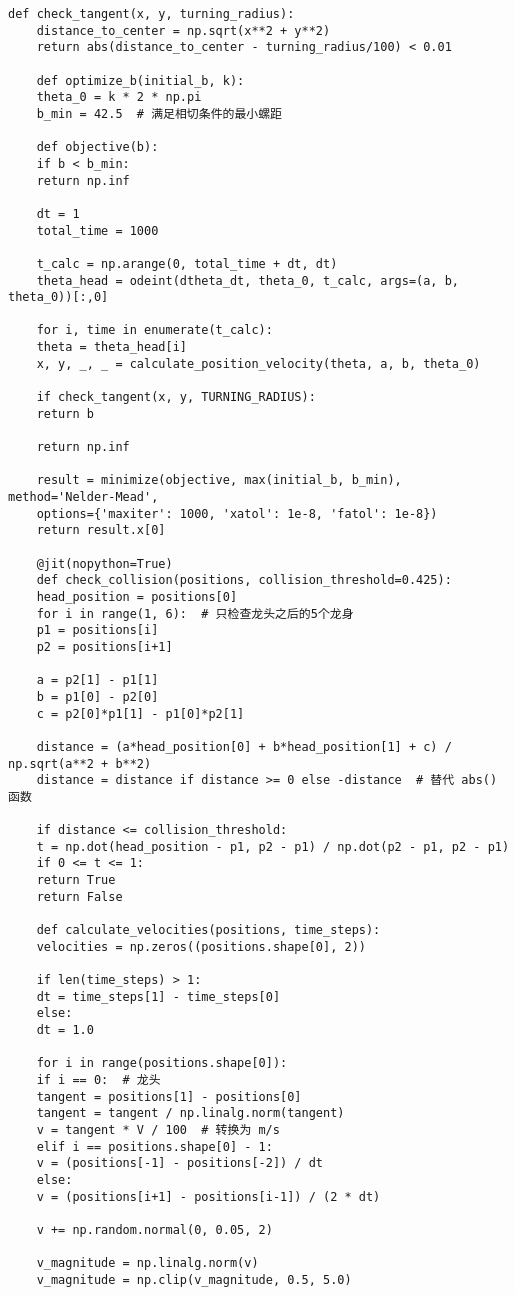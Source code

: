 \begin{lstlisting}[caption={问题三处理代码1}]
	def check_tangent(x, y, turning_radius):
	distance_to_center = np.sqrt(x**2 + y**2)
	return abs(distance_to_center - turning_radius/100) < 0.01
	
	def optimize_b(initial_b, k):
	theta_0 = k * 2 * np.pi
	b_min = 42.5  # 满足相切条件的最小螺距
	
	def objective(b):
	if b < b_min:
	return np.inf
	
	dt = 1
	total_time = 1000
	
	t_calc = np.arange(0, total_time + dt, dt)
	theta_head = odeint(dtheta_dt, theta_0, t_calc, args=(a, b, theta_0))[:,0]
	
	for i, time in enumerate(t_calc):
	theta = theta_head[i]
	x, y, _, _ = calculate_position_velocity(theta, a, b, theta_0)
	
	if check_tangent(x, y, TURNING_RADIUS):
	return b
	
	return np.inf
	
	result = minimize(objective, max(initial_b, b_min), method='Nelder-Mead', 
	options={'maxiter': 1000, 'xatol': 1e-8, 'fatol': 1e-8})
	return result.x[0]
	
	@jit(nopython=True)
	def check_collision(positions, collision_threshold=0.425):
	head_position = positions[0]
	for i in range(1, 6):  # 只检查龙头之后的5个龙身
	p1 = positions[i]
	p2 = positions[i+1]
	
	a = p2[1] - p1[1]
	b = p1[0] - p2[0]
	c = p2[0]*p1[1] - p1[0]*p2[1]
	
	distance = (a*head_position[0] + b*head_position[1] + c) / np.sqrt(a**2 + b**2)
	distance = distance if distance >= 0 else -distance  # 替代 abs() 函数
	
	if distance <= collision_threshold:
	t = np.dot(head_position - p1, p2 - p1) / np.dot(p2 - p1, p2 - p1)
	if 0 <= t <= 1:
	return True
	return False
	
	def calculate_velocities(positions, time_steps):
	velocities = np.zeros((positions.shape[0], 2))
	
	if len(time_steps) > 1:
	dt = time_steps[1] - time_steps[0]
	else:
	dt = 1.0
	
	for i in range(positions.shape[0]):
	if i == 0:  # 龙头
	tangent = positions[1] - positions[0]
	tangent = tangent / np.linalg.norm(tangent)
	v = tangent * V / 100  # 转换为 m/s
	elif i == positions.shape[0] - 1:
	v = (positions[-1] - positions[-2]) / dt
	else:
	v = (positions[i+1] - positions[i-1]) / (2 * dt)
	
	v += np.random.normal(0, 0.05, 2)
	
	v_magnitude = np.linalg.norm(v)
	v_magnitude = np.clip(v_magnitude, 0.5, 5.0)
	

\end{lstlisting}
